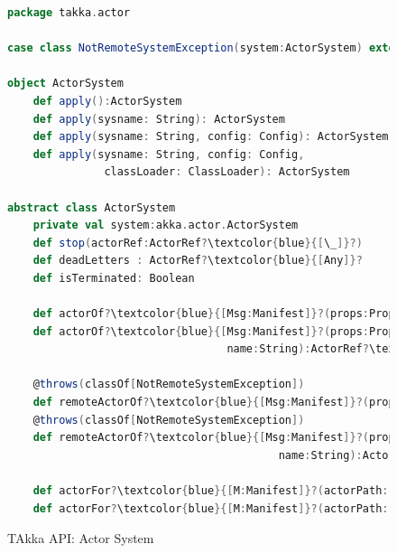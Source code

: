 \begin{figure}[h]
\begin{lstlisting}[language=scala, escapechar=?]
package takka.actor

case class NotRemoteSystemException(system:ActorSystem) extends Exception("ActorSystem: "+system+" does not support remoting")

object ActorSystem
    def apply():ActorSystem 
    def apply(sysname: String): ActorSystem 
    def apply(sysname: String, config: Config): ActorSystem 
    def apply(sysname: String, config: Config, 
               classLoader: ClassLoader): ActorSystem

abstract class ActorSystem
    private val system:akka.actor.ActorSystem
    def stop(actorRef:ActorRef?\textcolor{blue}{[\_]}?)
    def deadLetters : ActorRef?\textcolor{blue}{[Any]}?
    def isTerminated: Boolean
    
    def actorOf?\textcolor{blue}{[Msg:Manifest]}?(props:Props?\textcolor{blue}{[Msg]}?):ActorRef?\textcolor{blue}{[Msg]}?
    def actorOf?\textcolor{blue}{[Msg:Manifest]}?(props:Props?\textcolor{blue}{[Msg]}?, 
                                  name:String):ActorRef?\textcolor{blue}{[Msg]}?
    
    @throws(classOf[NotRemoteSystemException])
    def remoteActorOf?\textcolor{blue}{[Msg:Manifest]}?(props:Props?\textcolor{blue}{[Msg]}?):ActorRef?\textcolor{blue}{[Msg]}?
    @throws(classOf[NotRemoteSystemException])
    def remoteActorOf?\textcolor{blue}{[Msg:Manifest]}?(props:Props?\textcolor{blue}{[Msg]}?, 
                                          name:String):ActorRef?\textcolor{blue}{[Msg]}?
        
    def actorFor?\textcolor{blue}{[M:Manifest]}?(actorPath: String): ActorRef?\textcolor{blue}{[M]}?
    def actorFor?\textcolor{blue}{[M:Manifest]}?(actorPath: akka.actor.ActorPath): ActorRef?\textcolor{blue}{[M]}?
\end{lstlisting}
    \caption{TAkka API: Actor System}
    \label{takka_api_actor_system}
\end{figure}




